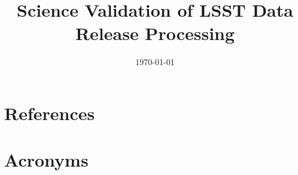 \documentclass[modern]{aastex62}
\begin{document}

\date{\today}
\title{ Science Validation of LSST Data Release Processing}





\appendix

\section{References} \label{sec:bib}



\section{Acronyms} \label{sec:acronyms}

\end{document}

